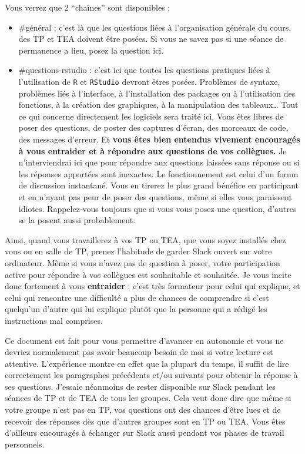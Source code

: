 \documentclass[
  letterpaper,
  DIV=11,
  numbers=noendperiod]{scrreprt}
\providecommand{\tightlist}{%
  \setlength{\itemsep}{0pt}\setlength{\parskip}{0pt}}\usepackage{longtable,booktabs,array}
\begin{document}
Vous verrez que 2 ``chaînes'' sont disponibles :

\begin{itemize}
\tightlist
\item
  \#général : c'est là que les questions liées à l'organisation générale
  du cours, des TP et TEA doivent être posées. Si vous ne savez pas si
  une séance de permanence a lieu, posez la question ici.
\item
  \#questions-rstudio : c'est ici que toutes les questions pratiques
  liées à l'utilisation de \texttt{R} et \texttt{RStudio} devront êtres
  posées. Problèmes de syntaxe, problèmes liés à l'interface, à
  l'installation des packages ou à l'utilisation des fonctions, à la
  création des graphiques, à la manipulation des tableaux\ldots{} Tout
  ce qui concerne directement les logiciels sera traité ici. Vous êtes
  libres de poser des questions, de poster des captures d'écran, des
  morceaux de code, des messages d'erreur. Et \textbf{vous êtes bien
  entendus vivement encouragés à vous entraider et à répondre aux
  questions de vos collègues.} Je n'interviendrai ici que pour répondre
  aux questions laissées sans réponse ou si les réponses apportées sont
  inexactes. Le fonctionnement est celui d'un forum de discussion
  instantané. Vous en tirerez le plus grand bénéfice en participant et
  en n'ayant pas peur de poser des questions, même si elles vous
  paraissent idiotes. Rappelez-vous toujours que si vous vous posez une
  question, d'autres se la posent aussi probablement.
\end{itemize}

Ainsi, quand vous travaillerez à vos TP ou TEA, que vous soyez installés
chez vous ou en salle de TP, prenez l'habitude de garder Slack ouvert
sur votre ordinateur. Même si vous n'avez pas de question à poser, votre
participation active pour répondre à vos collègues est souhaitable et
souhaitée. Je vous incite donc fortement à vous \textbf{entraider} :
c'est très formateur pour celui qui explique, et celui qui rencontre une
difficulté a plus de chances de comprendre si c'est quelqu'un d'autre
qui lui explique plutôt que la personne qui a rédigé les instructions
mal comprises.

Ce document est fait pour vous permettre d'avancer en autonomie et vous
ne devriez normalement pas avoir beaucoup besoin de moi si votre lecture
est attentive. L'expérience montre en effet que la plupart du temps, il
suffit de lire correctement les paragraphes précédents et/ou suivants
pour obtenir la réponse à ses questions. J'essaie néanmoins de rester
disponible sur Slack pendant les séances de TP et de TEA de tous les
groupes. Cela veut donc dire que même si votre groupe n'est pas en TP,
vos questions ont des chances d'être lues et de recevoir des réponses
dès que d'autres groupes sont en TP ou TEA. Vous êtes d'ailleurs
encouragés à échanger sur Slack aussi pendant vos phases de travail
personnels.
\end{document}
